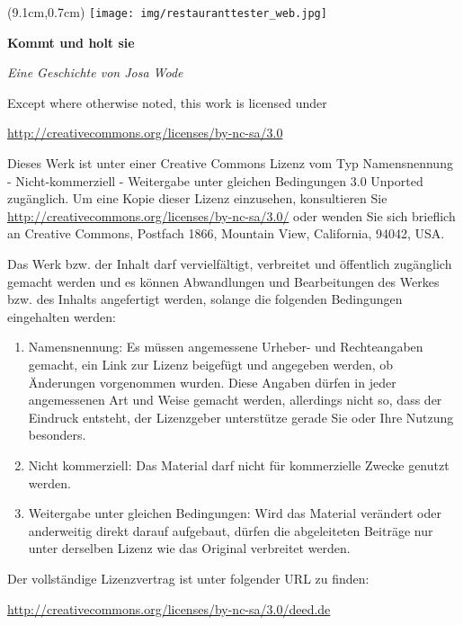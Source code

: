 \documentclass[paper=a5,fontsize=11pt,DIV=10]{scrreprt}
\begin{document}
\vspace*{3.6cm}

\begin{textblock*}{4.6cm}(9.1cm,0.7cm) %
\texttt{[image: img/restauranttester\_web.jpg]}
\end{textblock*}
\noindent
{\Huge \textbf{\sffamily Kommt und holt sie}}

\noindent
{\textit{Eine Geschichte von Josa Wode}}

\vspace{1.1cm}
\noindent

\clearpage
{}

{\licensefont\small
\noindent
Except where otherwise noted, this work is licensed under

\noindent
\url{http://creativecommons.org/licenses/by-nc-sa/3.0}

\vspace{0.5cm}
\noindent

Dieses Werk ist unter einer Creative Commons Lizenz vom Typ Namensnennung -
Nicht-kommerziell - Weitergabe unter gleichen Bedingungen 3.0 Unported
zugänglich. Um eine Kopie dieser Lizenz einzusehen, konsultieren Sie
\url{http://creativecommons.org/licenses/by-nc-sa/3.0/} oder wenden Sie sich
brieflich an Creative Commons, Postfach 1866, Mountain View, California, 94042,
USA.

Das Werk bzw. der Inhalt darf vervielfältigt, verbreitet und öffentlich
zugänglich gemacht werden und es können Abwandlungen und Bearbeitungen des
Werkes bzw. des Inhalts angefertigt werden, solange die folgenden Bedingungen
eingehalten werden:

\begin{enumerate}
\item Namensnennung: Es müssen angemessene Urheber- und Rechteangaben gemacht, ein
   Link zur Lizenz beigefügt und angegeben werden, ob Änderungen vorgenommen
   wurden. Diese Angaben dürfen in jeder angemessenen Art und Weise gemacht
   werden, allerdings nicht so, dass der Eindruck entsteht, der Lizenzgeber
   unterstütze gerade Sie oder Ihre Nutzung besonders.

\item  Nicht kommerziell: Das Material darf nicht für kommerzielle Zwecke genutzt
   werden.

\item  Weitergabe unter gleichen Bedingungen: Wird das Material verändert oder
   anderweitig direkt darauf aufgebaut, dürfen die abgeleiteten Beiträge nur
   unter derselben Lizenz wie das Original verbreitet werden.
\end{enumerate}

\noindent
Der vollständige Lizenzvertrag ist unter folgender URL zu finden:

\noindent
\url{http://creativecommons.org/licenses/by-nc-sa/3.0/deed.de}
}
\end{document}
